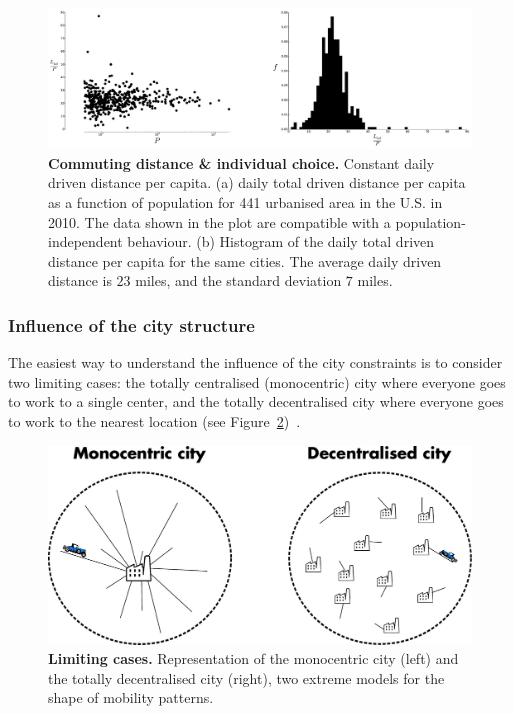 \begin{figure}[!h]
    \includegraphics[width=1.0\textwidth]{gfx/chapter-scaling/figure_2.pdf}
    \caption{{\bf Commuting distance \& individual choice.} Constant daily driven distance per capita. (a) daily total driven
        distance per capita as a function of population for 441 urbanised area
        in the U.S. in 2010. The data shown in the plot are compatible with a
    population-independent behaviour. (b) Histogram of the daily total driven
distance per capita for the same cities. The average daily driven distance is $23$ miles, and the standard deviation $7$ miles.}
\label{fig:LtotoverP} 
\end{figure}



\subsubsection{Influence of the city structure}
\label{sub:influence_of_the_city_structure}

The easiest way to understand the influence of the city constraints is to
consider two limiting cases: the totally centralised
(monocentric) city where everyone goes to work to a single center, and the
totally decentralised city where everyone goes to work to the nearest
location (see Figure~\ref{fig:monocentric_decentralised})~\cite{Samaniego:2008}.\\

\begin{figure}[!h]
    \centering
    \includegraphics[width=1\textwidth]{gfx/chapter-scaling/monocentric-decentralised.pdf}
    \caption{{\bf Limiting cases.} Representation of the monocentric city (left) and the totally
    decentralised city (right), two extreme models for the shape of mobility
patterns.\label{fig:monocentric_decentralised}}
\end{figure}

